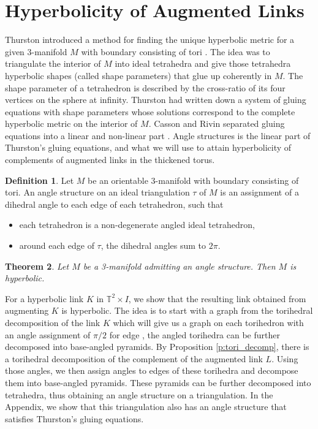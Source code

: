\documentclass[11pt]{amsart}
\newcommand{\prpref}[1]{Proposition \ref{#1}}
\newcommand{\torus}{{\mathbb{T}^2}}
\theoremstyle{plain}
\newtheorem{theorem}{Theorem}[section]
\theoremstyle{definition}
\newtheorem{define}[theorem]{Definition}
\begin{document}
\section{Hyperbolicity of Augmented Links}
\label{s:hyperbolicity}
Thurston introduced a method for finding the unique hyperbolic metric for a
given 3-manifold $M$ with boundary consisting of tori \cite{Thurston}. The idea
was to triangulate the interior of $M$ into ideal tetrahedra and give those
tetrahedra hyperbolic shapes (called shape parameters) that glue up coherently
in $M$. The shape parameter of a tetrahedron is described by the cross-ratio of
its four vertices on the sphere at infinity. Thurston had written down a system
of gluing equations with shape parameters whose solutions correspond to the
complete hyperbolic metric on the interior of $M$. Casson and Rivin separated
gluing equations into a linear and non-linear part \cite{Casson-Rivin}. Angle
structures is the linear part of Thurston's gluing equations, and what we will
use to attain hyperbolicity of complements of augmented links in the thickened
torus.


\begin{define}
Let $M$ be an orientable 3-manifold with boundary consisting of tori. An angle
structure on an ideal triangulation $\tau$ of $M$ is an assignment of a dihedral
angle to each edge of each tetrahedron, such that
\begin{itemize}
\item each tetrahedron is a non-degenerate angled ideal tetrahedron,
\item around each edge of $\tau$, the dihedral angles sum to $2\pi$.
\end{itemize}
\end{define}

\begin{theorem}\cite{Casson-Rivin}\label{thm:Casson-Rivin}
Let $M$ be a 3-manifold admitting an angle structure. Then $M$ is hyperbolic.
\end{theorem}

For a hyperbolic link $K$ in $\torus \times I$, we show
that the resulting link obtained from augmenting $K$ is
hyperbolic. The idea is to start with a graph from the torihedral decomposition
of the link $K$ which will give us a graph on each torihedron with an angle
assignment of
$\pi/2$ for edge
\cite{CKP2},
the angled torihedra can be further decomposed into base-angled pyramids.
By \prpref{p:tori_decomp},
there is a torihedral decomposition of the complement of the augmented link $L$.
Using those angles,
we then assign angles to edges of these torihedra
and decompose them into base-angled pyramids.
These pyramids can be further decomposed into tetrahedra,
thus obtaining an angle structure on a triangulation.
In the Appendix, we show that this triangulation
also has an angle structure that
satisfies Thurston's gluing equations.
\end{document}
